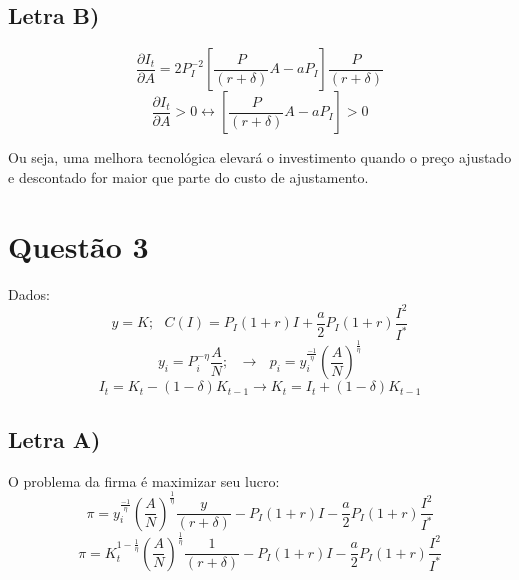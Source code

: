 \documentclass{article}
\begin{document}
\subsection*{Letra B)}
\begin{equation}
    \frac{\partial I_t}{\partial A}=
    2P_I^{-2} \left[\frac{P}{(r+\delta)}A - a P_I \right] \frac{P}{(r+\delta)}
\end{equation}
\begin{equation}
    \frac{\partial I_t}{\partial A} > 0 \longleftrightarrow \left[\frac{P}{(r+\delta)}A - a P_I \right] > 0
\end{equation}

Ou seja, uma melhora tecnológica elevará o investimento quando o preço ajustado e descontado for maior que parte do custo de ajustamento.

\section*{Questão 3}
Dados:
$$ y=K; \>\>\> C(I)=P_I(1+r)I+\frac{a}{2}P_I(1+r)\frac{I^2}{I^*}
$$
$$y_i=P_i^{-\eta}\frac{A}{N}; \>\>\> \to  \>\>\> p_i=y_i^{\frac{-1}{\eta}}\left(\frac{A}{N}\right)^\frac{1}{\eta}$$
$$I_t = K_t - (1-\delta)K_{t-1} \to K_t = I_t + (1-\delta)K_{t-1}$$
\subsection*{Letra A)}
O problema da firma é maximizar seu lucro:
\begin{equation}
    \pi = y_i^{\frac{-1}{\eta}}\left(\frac{A}{N}\right)^\frac{1}{\eta} \frac{y}{(r+\delta)} 
    - P_I(1+r)I-\frac{a}{2}P_I(1+r)\frac{I^2}{I^*}
\end{equation}
\begin{equation}
    \pi = K_t^{1-\frac{1}{\eta}}\left(\frac{A}{N}\right)^\frac{1}{\eta} \frac{1}{(r+\delta)} 
    - P_I(1+r)I-\frac{a}{2}P_I(1+r)\frac{I^2}{I^*}
\end{equation}
\end{document}
